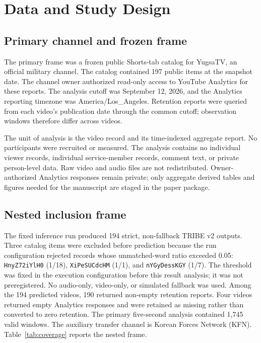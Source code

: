 \documentclass{ieeeaccess}
\begin{document}
\section{Data and Study Design}
\label{sec:data}

\subsection{Primary channel and frozen frame}
The primary frame was a frozen public Shorts-tab catalog for YugsaTV, an official military channel. The catalog contained 197 public items at the snapshot date. The channel owner authorized read-only access to YouTube Analytics for these reports. The analysis cutoff was September 12, 2026, and the Analytics reporting timezone was America/Los\_Angeles. Retention reports were queried from each video's publication date through the common cutoff; observation windows therefore differ across videos.

The unit of analysis is the video record and its time-indexed aggregate report. No participants were recruited or measured. The analysis contains no individual viewer records, individual service-member records, comment text, or private person-level data. Raw video and audio files are not redistributed. Owner-authorized Analytics responses remain private; only aggregate derived tables and figures needed for the manuscript are staged in the paper package.

\subsection{Nested inclusion frame}
The fixed inference run produced 194 strict, non-fallback TRIBE v2 outputs. Three catalog items were excluded before prediction because the run configuration rejected records whose unmatched-word ratio exceeded 0.05: \texttt{HnyZ72iYlH0} (1/18), \texttt{XiPeSUCdcHM} (1/1), and \texttt{nYGyDessKGY} (1/7). The threshold was fixed in the execution configuration before this result analysis; it was not preregistered. No audio-only, video-only, or simulated fallback was used. Among the 194 predicted videos, 190 returned non-empty retention reports. Four videos returned empty Analytics responses and were retained as missing rather than converted to zero retention. The primary five-second analysis contained 1,745 valid windows. The auxiliary transfer channel is Korean Forces Network (KFN). Table~\ref{tab:coverage} reports the nested frame.
\end{document}
